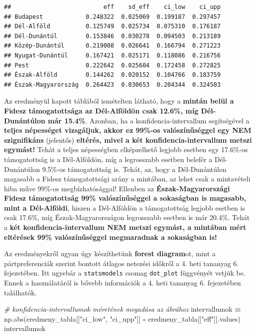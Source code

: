 \documentclass[
]{book}
\newenvironment{Shaded}{\begin{snugshade}}{\end{snugshade}}
\newcommand{\BuiltInTok}[1]{#1}
\newcommand{\CommentTok}[1]{\textcolor[rgb]{0.56,0.35,0.01}{\textit{#1}}}
\newcommand{\NormalTok}[1]{#1}
\newcommand{\OperatorTok}[1]{\textcolor[rgb]{0.81,0.36,0.00}{\textbf{#1}}}
\newcommand{\StringTok}[1]{\textcolor[rgb]{0.31,0.60,0.02}{#1}}
\begin{document}
\begin{verbatim}
##                          eff    sd_eff    ci_low    ci_upp
## Budapest            0.248322  0.025069  0.199187  0.297457
## Dél-Alföld          0.125749  0.025734  0.075310  0.176187
## Dél-Dunántúl        0.153846  0.030278  0.094503  0.213189
## Közép-Dunántúl      0.219008  0.026641  0.166794  0.271223
## Nyugat-Dunántúl     0.167421  0.025171  0.118086  0.216756
## Pest                0.222642  0.025604  0.172458  0.272825
## Észak-Alföld        0.144262  0.020152  0.104766  0.183759
## Észak-Magyarország  0.264423  0.030653  0.204344  0.324503
\end{verbatim}

Az eredményül kapott táblából ismételten látható, hogy a \textbf{mintán belül a Fidesz támogatottsága az Dél-Alföldön csak 12.6\%, míg Dél-Dunántúlon már 15.4\%}. Azonban, ha a konfidencia-intervallum segítségével a \textbf{teljes népességet vizsgáljuk, akkor ez 99\%-os valószínűséggel egy NEM szignifikáns} (jelentős) \textbf{eltérés, mivel a két konfidencia-intervallum metszi egymást!} Tehát a teljes népességben elképzelhető legjobb esetben egy 17.6\%-os támogatottság is a Dél-Alföldön, míg a legrosszabb esetben belefér a Dél-Dunántúlon 9.5\%-os támogatottság is. Tehát, az, hogy a Dél-Dunántúlon magasabb a Fidesz támogatottsági arány a mintában, az lehet csak a mintavételi hiba műve 99\%-os megbízhatósággal! Ellenben az \textbf{Észak-Magyarországi Fidesz támogatottság 99\% valószínűséggel a sokaságban is magasabb, mint a Dél-Alföldi}, hiszen a Dél-Alföldön a támogatottság legjobb esetben is csak 17.6\%, míg Észak-Magyarországon legrosszabb esetben is már 20.4\%. Tehát a \textbf{két konfidencia-intervallum NEM metszi egymást, a mintában mért eltérések 99\% valószínűséggel megmaradnak a sokaságban is!}

Az eredményekről ugyan úgy készíthetünk \textbf{forest diagram}ot, mint a pártpreferenciák szerint bontott átlagos netezési időkről a 4. heti tananyag 6. fejezetében. Itt ugyebár a \texttt{statsmodels} csomag \texttt{dot\_plot} függvényét vetjük be. Ennek a használatáról is bővebb információk a 4. heti tananyag 6. fejezetében találhatók.

\begin{Shaded}
\begin{Highlighting}[]
\CommentTok{\# konfidencia{-}intervallumok méretének megadása az ábrához}
\NormalTok{intervallumok }\OperatorTok{=}\NormalTok{ np.}\BuiltInTok{abs}\NormalTok{(eredmeny\_tabla[[}\StringTok{"ci\_low"}\NormalTok{, }\StringTok{"ci\_upp"}\NormalTok{]] }\OperatorTok{{-}}\NormalTok{ eredmeny\_tabla[[}\StringTok{"eff"}\NormalTok{]].values)}
\NormalTok{intervallumok}
\end{Highlighting}
\end{Shaded}
\end{document}
